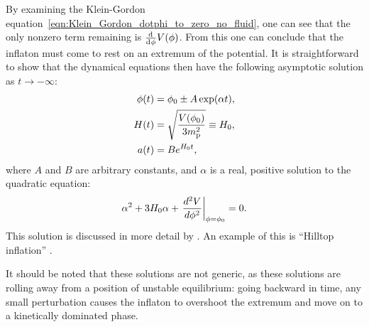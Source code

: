 By examining the Klein-Gordon equation~\eqref{eqn:Klein_Gordon_dotphi_to_zero_no_fluid}, one can see that the only nonzero term remaining is $\frac{\operatorname{d}^{}\!{}}{\operatorname{d}^{}\!{\phi}}V(\phi)$. From this one can conclude that the inflaton must come to rest on an extremum of the potential. It is straightforward to show that the dynamical equations then have the following asymptotic solution as $t \to -\infty$:
%
\begin{align}
  \phi(t)
  &=
  \phi_0 \pm A \exp(\alpha t),\\
  H(t)
  &=
  \sqrt{\frac{V(\phi_0)}{3m_{\mathrm{p}}^2}} \equiv H_0,\\
  a(t)
  &=
  B e^{H_0t},
\end{align}
%
where $A$ and $B$  are arbitrary constants, and $\alpha$ is a real, positive solution to the quadratic equation:
% 
%
\begin{equation}
  \alpha^2 + 3H_0\alpha + \left.
  \frac{{d^2}V}{{d}\phi^2}\right|_{\phi=\phi_0}=0.
\end{equation}
%
This solution is discussed in more detail by \citet{destri_preinflationary_2010}. An example of this is ``Hilltop inflation'' \citep{linde_1982,albrecht_1982}. 

It should be noted that these solutions are not generic, as these solutions are rolling away from a position of unstable equilibrium: going backward in time, any small perturbation causes the inflaton to overshoot the extremum and move on to a kinetically dominated phase.

